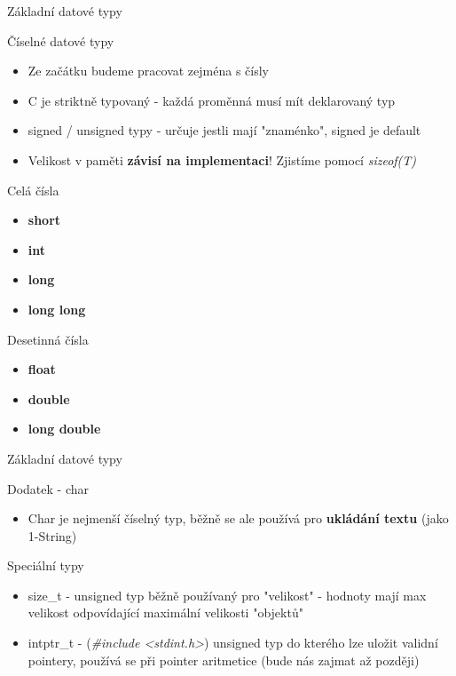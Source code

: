 \documentclass[9pt]{beamer}
\begin{document}
\begin{frame}{Základní datové typy}
    \begin{block}{Číselné datové typy}
        \begin{itemize}
            \item Ze začátku budeme pracovat zejména s čísly
            \item C je striktně typovaný - každá proměnná musí mít deklarovaný typ
            \item signed / unsigned typy - určuje jestli mají "znaménko", signed je default
            \item Velikost v paměti \textbf{závisí na implementaci}! Zjistíme pomocí \textit{sizeof(T)}
        \end{itemize}
    \end{block}

    \begin{block}{Celá čísla}
        \begin{itemize}
            \item \textbf{short}
            \item \textbf{int}
            \item \textbf{long}
            \item \textbf{long long}
        \end{itemize}
    \end{block}

    \begin{block}{Desetinná čísla}
        \begin{itemize}
            \item \textbf{float}
            \item \textbf{double}
            \item \textbf{long double}
        \end{itemize}
    \end{block}
\end{frame}

\begin{frame}{Základní datové typy}
    \begin{block}{Dodatek - char}
        \begin{itemize}
            \item Char je nejmenší číselný typ, běžně se ale používá pro \textbf{ukládání textu} (jako 1-String)
        \end{itemize}
    \end{block}

    \begin{block}{Speciální typy}
        \begin{itemize}
            \item size\_t - unsigned typ běžně používaný pro "velikost" - hodnoty mají max velikost odpovídající maximální velikosti "objektů"
            \item intptr\_t - (\textit{\#include <stdint.h>}) unsigned typ do kterého lze uložit validní pointery, používá se při pointer aritmetice (bude nás zajmat až později) 
        \end{itemize}
    \end{block}    
\end{frame}
\end{document}
